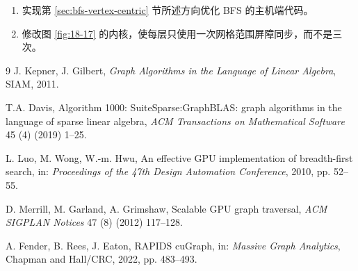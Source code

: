 \begin{enumerate}[label=\arabic*.,leftmargin=2.7em]
  \item 实现第 \ref{sec:bfs-vertex-centric} 节所述方向优化 BFS 的主机端代码。

  \item 修改图 \ref{fig:18-17} 的内核，使每层只使用一次网格范围屏障同步，而不是三次。
\end{enumerate}

\clearpage
\begin{chapterbibliography}{9}
  J. Kepner, J. Gilbert, \emph{Graph Algorithms in the Language of Linear Algebra},
  SIAM, 2011.

  T.A. Davis, Algorithm 1000: SuiteSparse:GraphBLAS: graph algorithms in the language
  of sparse linear algebra, \emph{ACM Transactions on Mathematical Software} 45 (4)
  (2019) 1--25.

  L. Luo, M. Wong, W.-m. Hwu, An effective GPU implementation of breadth-first search,
  in: \emph{Proceedings of the 47th Design Automation Conference}, 2010, pp. 52--55.

  D. Merrill, M. Garland, A. Grimshaw, Scalable GPU graph traversal,
  \emph{ACM SIGPLAN Notices} 47 (8) (2012) 117--128.

  A. Fender, B. Rees, J. Eaton, RAPIDS cuGraph, in: \emph{Massive Graph Analytics},
  Chapman and Hall/CRC, 2022, pp. 483--493.
\end{chapterbibliography}
